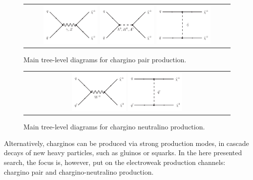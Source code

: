 \begin{figure}[!h]
  \centering 
  \begin{tabular}{c}
    \includegraphics[width=0.27\textwidth]{figures/analysis/ChiChi_GammaZ.pdf}
    \includegraphics[width=0.27\textwidth]{figures/analysis/ChiChi_Scalar.pdf}
    \includegraphics[width=0.27\textwidth]{figures/analysis/ChiChi_Squark.pdf}
  \end{tabular}
  \caption{Main tree-level diagrams for chargino pair production.}
  \label{fig:FeynmanDiagramProductionCharginoPair}
\end{figure}

\begin{figure}[!h]
  \centering 
  \begin{tabular}{c}
    \includegraphics[width=0.27\textwidth]{figures/analysis/ChiChi0_WBoson.pdf}
    \includegraphics[width=0.27\textwidth]{figures/analysis/ChiChi0_Squark.pdf}
  \end{tabular}
  \caption{Main tree-level diagrams for chargino neutralino production.}
  \label{fig:FeynmanDiagramProductionCharginoNeutralino}
\end{figure}
Alternatively, charginos can be produced via strong production modes, \ie in cascade decays of new heavy particles, such as gluinos or squarks.
In the here presented search, the focus is, however, put on the electroweak production channels: chargino pair and chargino-neutralino production.\\


